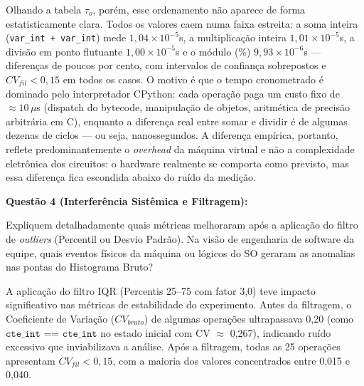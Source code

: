 \documentclass[12pt,a4paper]{article}
\newcommand{\codigo}[1]{\texttt{#1}}
\begin{document}
Olhando a tabela $\tau_o$, porém, esse ordenamento não aparece de forma estatisticamente clara. Todos os
valores caem numa faixa estreita: a soma inteira (\codigo{var\_int + var\_int}) mede $1{,}04 \times 10^{-5}$s,
a multiplicação inteira $1{,}01 \times 10^{-5}$s, a divisão em ponto flutuante $1{,}00 \times 10^{-5}$s e o
módulo ($\%$) $9{,}93 \times 10^{-6}$s — diferenças de poucos por cento, com intervalos de confiança
sobrepostos e $CV_{fil} < 0{,}15$ em todos os casos. O motivo é que o tempo cronometrado é dominado pelo
interpretador CPython: cada operação paga um custo fixo de $\approx 10\,\mu$s (dispatch do bytecode,
manipulação de objetos, aritmética de precisão arbitrária em C), enquanto a diferença real entre somar e
dividir é de algumas dezenas de ciclos — ou seja, nanossegundos. A diferença empírica, portanto, reflete
predominantemente o \textit{overhead} da máquina virtual e não a complexidade eletrônica dos circuitos: o
hardware realmente se comporta como previsto, mas essa diferença fica escondida abaixo do ruído da medição.

\vspace{0.55cm}

\textbf{Questão 4 (Interferência Sistêmica e Filtragem):}

Expliquem detalhadamente quais métricas melhoraram após a aplicação do filtro de \textit{outliers} (Percentil
ou Desvio Padrão). Na visão de engenharia de software da equipe, quais eventos físicos da máquina
ou lógicos do SO geraram as anomalias nas pontas do Histograma Bruto?

A aplicação do filtro IQR (Percentis 25--75 com fator 3,0) teve impacto significativo nas métricas de estabilidade do experimento. Antes da filtragem, o Coeficiente de Variação ($CV_{bruto}$) de algumas operações ultrapassava 0,20 (como $\codigo{cte\_int == cte\_int}$ no estado inicial com CV $\approx$ 0,267), indicando ruído excessivo que inviabilizava a análise. Após a filtragem, todas as 25 operações apresentam $CV_{fil} < 0,15$, com a maioria dos valores concentrados entre 0,015 e 0,040.
\end{document}
